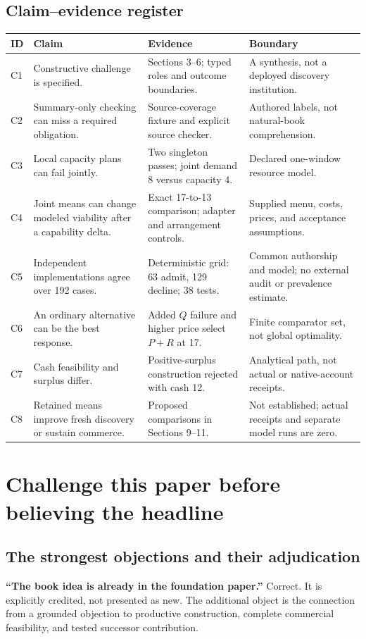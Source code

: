 \documentclass[11pt,a4paper]{article}
\begin{document}
\subsection{Claim--evidence register}
\begin{longtable}{@{}L{10mm}L{50mm}L{45mm}L{43mm}@{}}
\toprule\textbf{ID}&\textbf{Claim}&\textbf{Evidence}&\textbf{Boundary}\\\midrule\endhead
C1 & Constructive challenge is specified. & Sections 3--6; typed roles and outcome boundaries. & A synthesis, not a deployed discovery institution.\\
C2 & Summary-only checking can miss a required obligation. & Source-coverage fixture and explicit source checker. & Authored labels, not natural-book comprehension.\\
C3 & Local capacity plans can fail jointly. & Two singleton passes; joint demand 8 versus capacity 4. & Declared one-window resource model.\\
C4 & Joint means can change modeled viability after a capability delta. & Exact 17-to-13 comparison; adapter and arrangement controls. & Supplied menu, costs, prices, and acceptance assumptions.\\
C5 & Independent implementations agree over 192 cases. & Deterministic grid: 63 admit, 129 decline; 38 tests. & Common authorship and model; no external audit or prevalence estimate.\\
C6 & An ordinary alternative can be the best response. & Added $Q$ failure and higher price select $P+R$ at 17. & Finite comparator set, not global optimality.\\
C7 & Cash feasibility and surplus differ. & Positive-surplus construction rejected with cash 12. & Analytical path, not actual or native-account receipts.\\
C8 & Retained means improve fresh discovery or sustain commerce. & Proposed comparisons in Sections 9--11. & Not established; actual receipts and separate model runs are zero.\\
\bottomrule
\end{longtable}

\clearpage
\section{Challenge this paper before believing the headline}
\subsection{The strongest objections and their adjudication}
\textbf{``The book idea is already in the foundation paper.''} Correct. It is explicitly credited, not presented as new. The additional object is the connection from a grounded objection to productive construction, complete commercial feasibility, and tested successor contribution.
\end{document}
